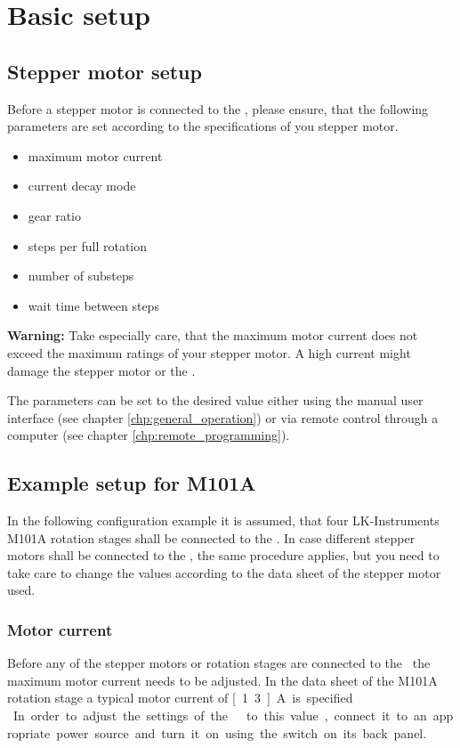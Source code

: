 \section{Basic setup}

\subsection{Stepper motor setup}
Before a stepper motor is connected to the \productName , please ensure, that the following parameters are set according to the specifications of you stepper motor.

\begin{itemize}
\item maximum motor current
\item current decay mode
\item gear ratio
\item steps per full rotation
\item number of substeps
\item wait time between steps
\end{itemize}

\textbf{Warning:} Take especially care, that the maximum motor current does not exceed the maximum ratings of your stepper motor. A high current might damage the stepper motor or the \productName .

The parameters can be set to the desired value either using the manual user interface (see chapter \ref{chp:general_operation}) or via remote control through a computer (see chapter \ref{chp:remote_programming}).

\subsection{Example setup for M101A}
In the following configuration example it is assumed, that four LK-Instruments M101A rotation stages shall be connected to the \productName . In case different stepper motors shall be connected to the \productName , the same procedure applies, but you need to take care to change the values according to the data sheet of the stepper motor used.

\subsubsection{Motor current}
Before any of the stepper motors or rotation stages are connected to the \productName ~the maximum motor current needs to be adjusted. In the data sheet of the M101A rotation stage a typical motor current of \unit[1.3]{A} is specified.\\
In order to adjust the settings of the \productNumber ~\productName ~to this value, connect it to an appropriate power source and turn it on using the switch on its back panel.

